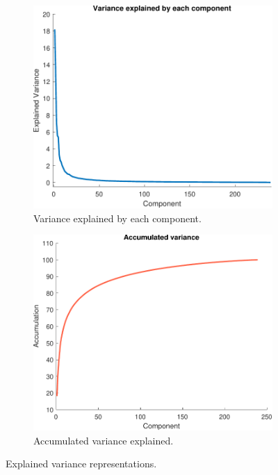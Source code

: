 \documentclass[a4paper]{article}
\begin{document}
\begin{figure}[H]
  \centering
       \begin{subfigure}[t]{0.45\textwidth}
         \centering
         \includegraphics[scale=0.6]{Figures/VariancePerComponent}
         \caption{Variance explained by each component.}
     \end{subfigure}%
     \quad
     \begin{subfigure}[t]{0.45\textwidth}
         \centering
         \includegraphics[scale=0.6]{Figures/accumulated_variance}
         \caption{Accumulated variance explained.}
     \end{subfigure}
    \caption{Explained variance representations.}
    \label{fig:ex2b}
\end{figure}
\end{document}
